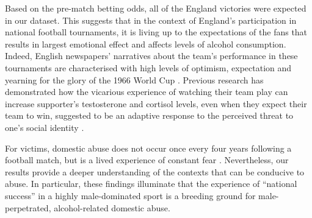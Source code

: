 \documentclass[12pt, a4paper]{article}
\begin{document}
Based on the pre-match betting odds, all of the England victories were expected in our dataset. This suggests that in the context of England's participation in national football tournaments, it is living up to the expectations of the fans that results in largest emotional effect and affects levels of alcohol consumption. Indeed, English newspapers' narratives about the team's performance in these tournaments are characterised with high levels of optimism, expectation and yearning for the glory of the 1966 World Cup \cite{Vincent2010}. Previous research has demonstrated how the vicarious experience of watching their team play can increase supporter's testosterone and cortisol levels, even when they expect their team to win, suggested to be an adaptive response to the perceived threat to one's social identity \cite{VanderMeij2012}. 








For victims, domestic abuse does not occur once every four years following a football match, but is a lived experience of constant fear \cite{Brooks-Hay2018}. Nevertheless, our results provide a deeper understanding of the contexts that can be conducive to abuse. In particular, these findings illuminate that the experience of ``national success'' in a highly male-dominated sport is a breeding ground for male-perpetrated, alcohol-related domestic abuse.

\newpage




%
%
%
\end{document}
